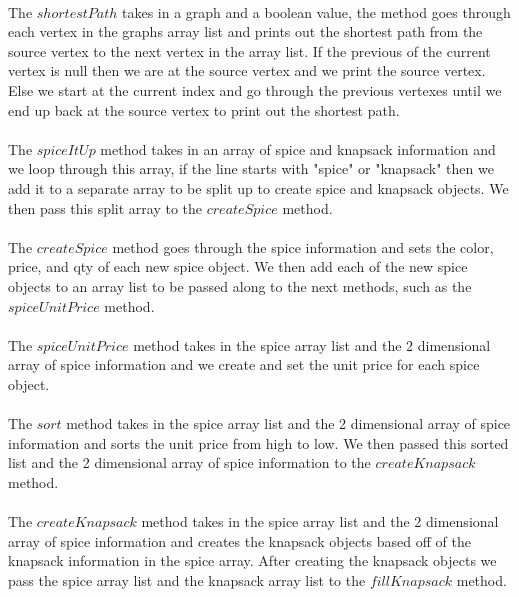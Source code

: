 \documentclass[letterpaper, 10pt,DIV=13]{scrartcl}
\numberwithin{equation}{section} %
\numberwithin{figure}{section} %
\numberwithin{table}{section} %
\begin{document}
\paragraph{} The $shortestPath$ takes in a graph and a boolean value, the method goes through each vertex in the graphs array list and prints out the shortest path from the source vertex to the next vertex in the array list. If the previous of the current vertex is null then we are at the source vertex and we print the source vertex. Else we start at the current index and go through the previous vertexes until we end up back at the source vertex to print out the shortest path.

\paragraph{} The $spiceItUp$ method takes in an array of spice and knapsack information and we loop through this array, if the line starts with "spice" or "knapsack" then we add it to a separate array to be split up to create spice and knapsack objects. We then pass this split array to the $createSpice$ method.

\paragraph{} The $createSpice$ method goes through the spice information and sets the color, price, and qty of each new spice object. We then add each of the new spice objects to an array list to be passed along to the next methods, such as the $spiceUnitPrice$ method. 

\paragraph{} The $spiceUnitPrice$ method takes in the spice array list and the 2 dimensional array of spice information and we create and set the unit price for each spice object.

\paragraph{} The $sort$ method takes in the spice array list and the 2 dimensional array of spice information and sorts the unit price from high to low. We then passed this sorted list and the 2 dimensional array of spice information to the $createKnapsack$ method.

\paragraph{} The $createKnapsack$ method takes in the spice array list and the 2 dimensional array of spice information and creates the knapsack objects based off of the knapsack information in the spice array. After creating the knapsack objects we pass the spice array list and the knapsack array list to the $fillKnapsack$ method.
\end{document}
